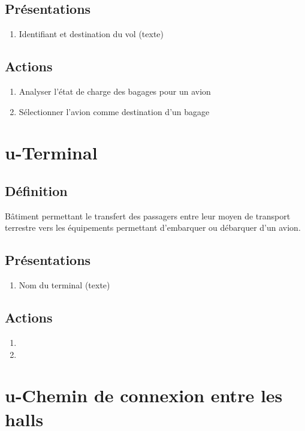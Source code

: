 \subsection{Présentations}
\begin{enumerate}
	\item Identifiant et destination du vol (texte)
\end{enumerate}

\subsection{Actions}
\begin{enumerate}
	\item Analyser l'état de charge des bagages pour un avion
	\item Sélectionner l'avion comme destination d'un bagage
\end{enumerate}

\section{u-Terminal}
\subsection{Définition}
	Bâtiment permettant le transfert des passagers entre leur moyen de transport terrestre vers les équipements permettant d'embarquer ou débarquer d'un avion.

\subsection{Présentations}
\begin{enumerate}
	\item Nom du terminal (texte)
\end{enumerate}

\subsection{Actions}
\begin{enumerate}
	\item {}
	\item {}
\end{enumerate}

\section{u-Chemin de connexion entre les halls}
